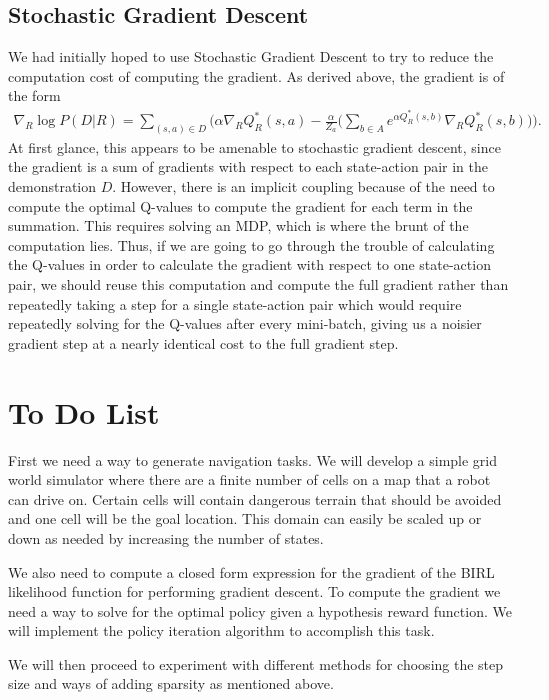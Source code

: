 \documentclass[10pt,a4paper]{article}
\begin{document}
\subsection{Stochastic Gradient Descent}
We had initially hoped to use Stochastic Gradient Descent to try to reduce the computation cost of computing the gradient. As derived above, the gradient is of the form 
\begin{eqnarray}
\nabla_R \log P(D | R) = \sum_{(s,a) \in D} \bigg(\alpha \nabla_R Q_R^*(s,a) - \frac{\alpha}{Z_a}\bigg(\sum_{b \in A} e^{\alpha Q_R^*(s,b)} \nabla_R Q_R^*(s,b)\bigg) \bigg).
\end{eqnarray}
At first glance, this appears to be amenable to stochastic gradient descent, since the gradient is a sum of gradients with respect to each state-action pair in the demonstration $D$. However, there is an implicit coupling because of the need to compute the optimal Q-values to compute the gradient for each term in the summation. This requires solving an MDP, which is where the brunt of the computation lies. Thus, if we are going to go through the trouble of calculating the Q-values in order to calculate the gradient with respect to one state-action pair, we should reuse this computation and compute the full gradient rather than repeatedly taking a step for a single state-action pair which would require repeatedly solving for the Q-values after every mini-batch, giving us a noisier gradient step at a nearly identical cost to the full gradient step.


\section{To Do List}
First we need a way to generate navigation tasks. We will develop a simple grid world simulator where there are a finite number of cells on a map that a robot can drive on. Certain cells will contain dangerous terrain that should be avoided and one cell will be the goal location. This domain can easily be scaled up or down as needed by increasing the number of states.

We also need to compute a closed form expression for the gradient of the BIRL likelihood function for performing gradient descent. To compute the gradient we need a way to solve for the optimal policy given a hypothesis reward function. We will implement the policy iteration algorithm to accomplish this task. 

We will then proceed to experiment with different methods for choosing the step size and ways of adding sparsity as mentioned above. 
\end{document}
